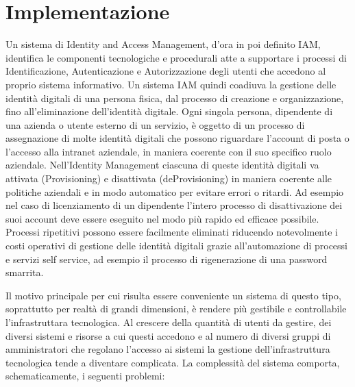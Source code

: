 \chapter{Implementazione}

Un sistema di Identity and Access Management, d'ora in poi definito
IAM, identifica le componenti tecnologiche e
procedurali atte a supportare i processi di Identificazione,
Autenticazione e Autorizzazione degli utenti che accedono al
proprio sistema informativo.
Un sistema IAM quindi coadiuva la gestione delle identità digitali
di una persona fisica, dal processo di creazione e organizzazione, fino
all'eliminazione dell'identità digitale.
Ogni singola persona, dipendente di una azienda o utente esterno di un servizio,
è oggetto di un processo di assegnazione di molte identità digitali che possono
riguardare l'account di posta o l'accesso alla intranet aziendale, in maniera
coerente con il suo specifico ruolo aziendale.
Nell'Identity Management ciascuna di queste identità digitali va attivata
(Provisioning) e disattivata (deProvisioning) in maniera coerente alle politiche
aziendali e in modo automatico per evitare errori o ritardi. Ad esempio nel caso
di licenziamento di un dipendente l'intero processo di disattivazione dei suoi
account deve essere eseguito nel modo più rapido ed efficace possibile.
Processi ripetitivi possono essere facilmente eliminati riducendo notevolmente i
costi operativi di gestione delle identità digitali grazie all'automazione di
processi e servizi self service, ad esempio il processo di rigenerazione di una
password smarrita.

Il motivo principale per cui risulta essere conveniente un sistema di questo
tipo, soprattutto per realtà di grandi dimensioni, è rendere più gestibile e
controllabile l'infrastruttara tecnologica.
Al crescere della quantità di utenti da gestire, dei diversi sistemi e risorse a
cui questi accedono e al numero di diversi gruppi di amministratori che regolano
l'accesso ai sistemi la gestione dell'infrastruttura tecnologica tende a
diventare complicata.
La complessità del sistema comporta, schematicamente, i seguenti problemi:


